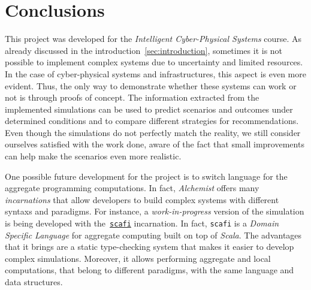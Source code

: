 \section{Conclusions}
This project was developed for the \textit{Intelligent Cyber-Physical Systems} course.
As already discussed in the introduction~\ref{sec:introduction}, sometimes it is not possible to implement complex systems due to uncertainty and limited resources.
In the case of cyber-physical systems and infrastructures, this aspect is even more evident.
Thus, the only way to demonstrate whether these systems can work or not is through proofs of concept.
The information extracted from the implemented simulations can be used to predict scenarios and outcomes 
under determined conditions and to compare different strategies for recommendations.
Even though the simulations do not perfectly match the reality, we still consider ourselves satisfied 
with the work done, aware of the fact that small improvements can help make the scenarios even more 
realistic.

One possible future development for the project is to switch language for the aggregate programming computations.
In fact, \textit{Alchemist} offers many \textit{incarnations} that allow developers to build complex systems with different syntaxs and paradigms.
For instance, a \textit{work-in-progress} version of the simulation is being developed with the~\href{https://scafi.github.io/}{\texttt{scafi}} incarnation.
In fact, \texttt{scafi} is a \textit{Domain Specific Language} for aggregate computing built on top of \textit{Scala}.
The advantages that it brings are a static type-checking system that makes it easier to develop complex simulations.
Moreover, it allows performing aggregate and local computations, that belong to different paradigms, with the same language and data structures.
